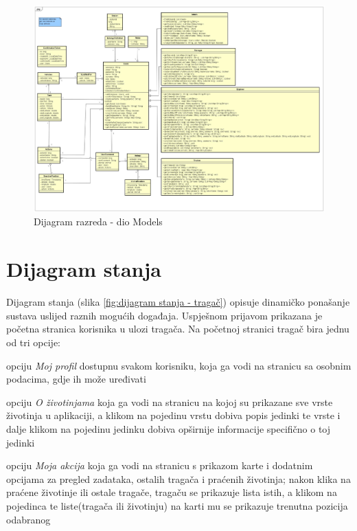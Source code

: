 			\begin{figure}[H]
				\includegraphics[scale=0.15]{slike/klasni_dijagram_models.jpg}
				\centering
				\caption{Dijagram razreda - dio Models}
				\label{fig:models}
			\end{figure}
			
			
			
			\eject
		
		\section{Dijagram stanja}
			
			Dijagram stanja (slika \ref{fig:dijagram stanja - tragač}) opisuje dinamičko ponašanje sustava uslijed raznih mogućih
		događaja. Uspješnom prijavom prikazana je početna stranica korisnika u ulozi tragača. 
		Na početnoj stranici tragač bira jednu od tri opcije:
		\begin{packed_item}
		\item opciju \textit{Moj profil} dostupnu svakom korisniku, koja ga vodi na stranicu sa osobnim podacima, gdje ih može uređivati
		\item opciju \textit{O životinjama} koja ga vodi na stranicu na kojoj su prikazane sve vrste životinja u aplikaciji, a klikom na pojedinu vrstu dobiva popis jedinki te vrste i dalje klikom na pojedinu jedinku dobiva opširnije informacije specifično o toj jedinki
		\item opciju \textit{Moja akcija} koja ga vodi na stranicu s prikazom karte i dodatnim opcijama za pregled zadataka, ostalih tragača i praćenih životinja; nakon klika na praćene životinje ili ostale tragače, tragaču se prikazuje lista istih, a klikom na pojedinca te liste(tragača ili životinju) na karti mu se prikazuje trenutna pozicija odabranog
		\end{packed_item}

